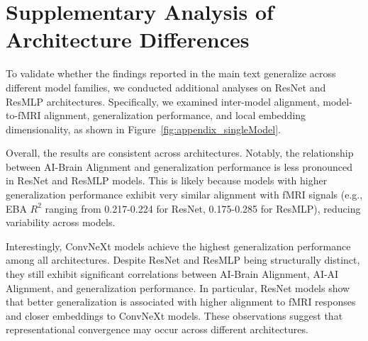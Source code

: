 \documentclass{article}
\theoremstyle{plain}
\theoremstyle{definition}
\theoremstyle{remark}
\begin{document}



\section{Supplementary Analysis of Architecture Differences}
\label{supple:architecture_differences}




To validate whether the findings reported in the main text generalize across different model families, we conducted additional analyses on ResNet and ResMLP architectures. Specifically, we examined inter-model alignment, model-to-fMRI alignment, generalization performance, and local embedding dimensionality, as shown in Figure~\ref{fig:appendix_singleModel}. 

Overall, the results are consistent across architectures. Notably, the relationship between AI-Brain Alignment and generalization performance is less pronounced in ResNet and ResMLP models. This is likely because models with higher generalization performance exhibit very similar alignment with fMRI signals (e.g., EBA $R^2$ ranging from 0.217-0.224 for ResNet, 0.175-0.285 for ResMLP), reducing variability across models. 

Interestingly, ConvNeXt models achieve the highest generalization performance among all architectures. Despite ResNet and ResMLP being structurally distinct, they still exhibit significant correlations between AI-Brain Alignment, AI-AI Alignment, and generalization performance. In particular, ResNet models show that better generalization is associated with higher alignment to fMRI responses and closer embeddings to ConvNeXt models. These observations suggest that representational convergence may occur across different architectures.
\end{document}
